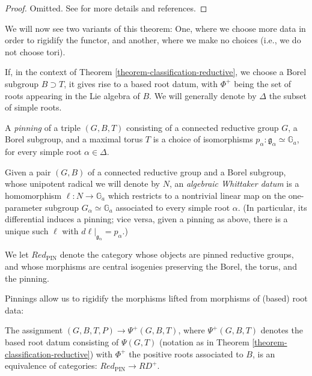 \begin{proof}
 Omitted. See \cite{Springer-Corvallis} for more details and references.
\end{proof}




We will now see two variants of this theorem: One, where we choose more data in order to rigidify the functor, and another, where we make no choices (i.e., we do not choose tori).


If, in the context of Theorem \ref{theorem-classification-reductive}, we choose a Borel subgroup $B\supset T$, it gives rise to a based root datum, with $\Phi^+$ being the set of roots appearing in the Lie algebra of $B$. We will generally denote by $\Delta$ the subset of simple roots.

\begin{definition}
 \label{definition-pinning}
A {\it pinning} of a triple $(G, B, T)$ consisting of a connected reductive group $G$, a Borel subgroup,  and a maximal torus $T$ is a choice of isomorphisms $p_\alpha:\mathfrak g_\alpha \simeq \mathbb G_a$, for every simple root $\alpha\in \Delta$.

Given a pair $(G,B)$ of a connected reductive group and a Borel subgroup, whose unipotent radical we will denote by $N$, an {\it algebraic Whittaker datum} is a homomorphism $\ell:N\to \mathbb G_a$ which restricts to a nontrivial linear map on the one-parameter subgroup $G_\alpha\simeq \mathbb G_a$ associated to every simple root $\alpha$. (In particular, its differential induces a pinning; vice versa, given a pinning as above, there is a unique such $\ell$ with $d\ell|_{\mathfrak g_\alpha} = p_\alpha$.)

We let $Red_{\text{PIN}}$ denote the category whose objects are pinned reductive groups, and whose morphisms are central isogenies preserving the Borel, the torus, and the pinning.
\end{definition}

Pinnings allow us to rigidify the morphisms lifted from morphisms of (based) root data:

\begin{theorem}
\label{theorem-classification-with-pinning}
The assignment $(G, B, T, P) \to \Psi^+(G,B,T)$, where $\Psi^+(G,B,T)$ denotes the based root datum consisting of $\Psi(G,T)$ (notation as in Theorem \ref{theorem-classification-reductive}) with $\Phi^+$ the positive roots associated to $B$, is an equivalence of categories: $Red_{\text{PIN}}\to RD^+$.
\end{theorem}

